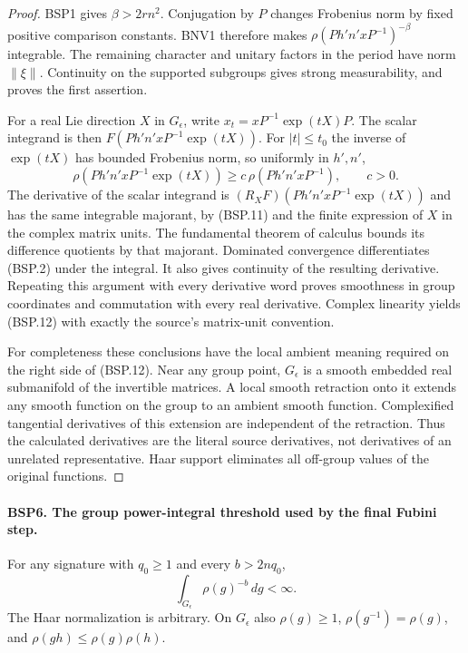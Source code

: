 \begin{proof}
BSP1 gives $\beta>2rn^2$.  Conjugation by $P$ changes Frobenius norm
by fixed positive comparison constants.  BNV1 therefore makes
$\rho(P h'n'xP^{-1})^{-\beta}$ integrable.  The remaining character
and unitary factors in the period have norm $\|\xi\|$.
Continuity on the supported subgroups gives strong measurability,
and proves the first assertion.

For a real Lie direction $X$ in $G_\epsilon$, write
$x_t=xP^{-1}\exp(tX)P$.  The scalar integrand is then
$F(P h'n'xP^{-1}\exp(tX))$.
For $|t|\le t_0$ the inverse of $\exp(tX)$ has bounded Frobenius norm,
so uniformly in $h',n'$,
\[
 \rho(P h'n'xP^{-1}\exp(tX))
       \ge c\,\rho(P h'n'xP^{-1}),\qquad c>0.
\]
The derivative of the scalar integrand is
$(R_XF)(P h'n'xP^{-1}\exp(tX))$ and has the same integrable majorant,
by (BSP.11) and the finite expression of $X$ in the complex matrix units.
The fundamental theorem of calculus bounds its difference quotients
by that majorant.  Dominated convergence differentiates (BSP.2) under
the integral.  It also gives continuity of the resulting derivative.
Repeating this argument with every derivative word proves smoothness
in group coordinates and commutation with every real derivative.
Complex linearity yields (BSP.12) with exactly the source's matrix-unit
convention.

For completeness these conclusions have the local ambient meaning
required on the right side of (BSP.12).  Near any group point,
$G_\epsilon$ is a smooth embedded real submanifold of the invertible
matrices.  A local smooth retraction onto it extends any smooth function
on the group to an ambient smooth function.  Complexified tangential
derivatives of this extension are independent of the retraction.
Thus the calculated derivatives are the literal source derivatives,
not derivatives of an unrelated representative.  Haar support
eliminates all off-group values of the original functions.
\end{proof}

\paragraph{BSP6. The group power-integral threshold used by the final Fubini step.}
\label{claim:BSP6}
For any signature with $q_0\ge1$ and every $b>2nq_0$,
\[
             \int_{G_\epsilon}\rho(g)^{-b}\,dg<\infty.
 \tag{BSP.13}
\]
The Haar normalization is arbitrary.  On $G_\epsilon$ also
$\rho(g)\ge1$, $\rho(g^{-1})=\rho(g)$, and
$\rho(gh)\le\rho(g)\rho(h)$.

